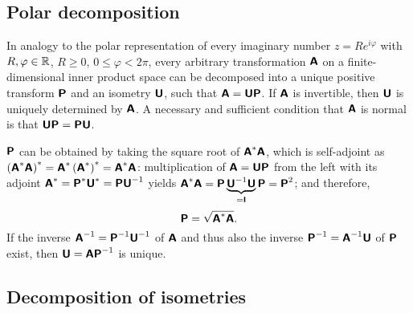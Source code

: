 \subsection{Polar decomposition}

In analogy to the polar representation of every imaginary number $z= R e^{i\varphi}$ with $R,\varphi \in {\Bbb R}$, $R\ge 0$,
$0\le \varphi < 2\pi$,
every arbitrary transformation $\textsf{\textbf{A}}$ on a finite-dimensional inner product space can be decomposed into
a unique positive transform
$\textsf{\textbf{P}}$ and an isometry
$\textsf{\textbf{U}}$, such that $\textsf{\textbf{A}}= \textsf{\textbf{U}} \textsf{\textbf{P}}$.
If $\textsf{\textbf{A}}$ is invertible, then $\textsf{\textbf{U}}$  is uniquely determined by
$\textsf{\textbf{A}}$.
A necessary and sufficient condition that $\textsf{\textbf{A}}$ is normal is that
$\textsf{\textbf{U}} \textsf{\textbf{P}}=\textsf{\textbf{P}} \textsf{\textbf{U}} $.

$\textsf{\textbf{P}}$ can be obtained by taking the square root of $\textsf{\textbf{A}}^\ast \textsf{\textbf{A}}$,
which is self-adjoint as
$\left(\textsf{\textbf{A}}^\ast \textsf{\textbf{A}}\right)^\ast=
\textsf{\textbf{A}}^\ast \left(\textsf{\textbf{A}}^\ast \right)^\ast =\textsf{\textbf{A}}^\ast \textsf{\textbf{A}}$:
multiplication of  $\textsf{\textbf{A}}=\textsf{\textbf{U}} \textsf{\textbf{P}}$ from the left with its adjoint
$\textsf{\textbf{A}}^\ast= \textsf{\textbf{P}}^\ast \textsf{\textbf{U}}^\ast
= \textsf{\textbf{P}}  \textsf{\textbf{U}} ^{-1}$
yields
$
\textsf{\textbf{A}}^\ast \textsf{\textbf{A}}
=
 \textsf{\textbf{P}}   \underbrace{ \textsf{\textbf{U}} ^{-1} \textsf{\textbf{U}}}_{= \textsf{\textbf{I}}} \textsf{\textbf{P}}
=
\textsf{\textbf{P}}^2
$; and therefore,
\begin{equation}
\textsf{\textbf{P}}= \sqrt{\textsf{\textbf{A}}^\ast \textsf{\textbf{A}}}.
\end{equation}
If the inverse $\textsf{\textbf{A}}^{-1} =  \textsf{\textbf{P}}^{-1} \textsf{\textbf{U}}^{-1}$ of $\textsf{\textbf{A}}$
and thus also the inverse  $\textsf{\textbf{P}}^{-1} =  \textsf{\textbf{A}}^{-1} \textsf{\textbf{U}}$
 of $\textsf{\textbf{P}}$
exist, then $\textsf{\textbf{U}} =  \textsf{\textbf{A}}   \textsf{\textbf{P}}^{-1}$ is unique.

\subsection{Decomposition of isometries}

